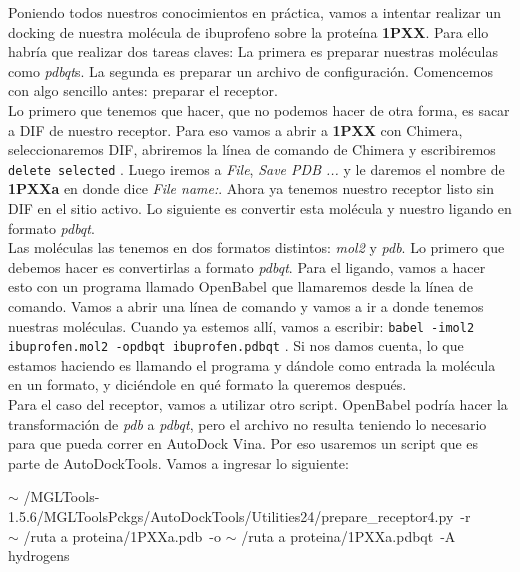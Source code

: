 \documentclass[10pt,letterpaper]{article}
\newcommand{\inlinecode}[1]{
\colorbox{light-gray}{\texttt{#1}}
}
\newenvironment{Code}
{
\begin{lrbox}{\selvestebox}%
\begin{minipage}{\dimexpr\columnwidth-2\fboxsep\relax}
\fontfamily{\ttdefault}\selectfont
}
{\end{minipage}\end{lrbox}%
\begin{center}
\colorbox{light-gray}{\usebox{\selvestebox}}
\end{center}
}
\begin{document}
Poniendo todos nuestros conocimientos en pr\'actica, vamos a intentar realizar un docking de nuestra mol\'ecula de ibuprofeno sobre la prote\'ina \textbf{1PXX}. Para ello habr\'ia que realizar dos tareas claves: La primera es preparar nuestras mol\'eculas como \textit{pdbqt}s. La segunda es preparar un archivo de configuraci\'on. Comencemos con algo sencillo antes: preparar el receptor.\\

Lo primero que tenemos que hacer, que no podemos hacer de otra forma, es sacar a DIF de nuestro receptor. Para eso vamos a abrir a \textbf{1PXX} con Chimera, seleccionaremos DIF, abriremos la l\'inea de comando de Chimera y escribiremos \inlinecode{delete selected}. Luego iremos a \emph{File}, \emph{Save PDB ...} y le daremos el nombre de \textbf{1PXXa} en donde dice \emph{File name:}. Ahora ya tenemos nuestro receptor listo sin DIF en el sitio activo. Lo siguiente es convertir esta mol\'ecula y nuestro ligando en formato \emph{pdbqt}.\\

Las mol\'eculas las tenemos en dos formatos distintos: \emph{mol2} y \emph{pdb}. Lo primero que debemos hacer es convertirlas a formato \emph{pdbqt}. Para el ligando, vamos a hacer esto con un programa llamado OpenBabel que llamaremos desde la l\'inea de comando. Vamos a abrir una l\'inea de comando y vamos a ir a donde tenemos nuestras mol\'eculas. Cuando ya estemos all\'i, vamos a escribir: \inlinecode{babel -imol2 ibuprofen.mol2 -opdbqt ibuprofen.pdbqt}. Si nos damos cuenta, lo que estamos haciendo es llamando el programa y d\'andole como entrada la mol\'ecula en un formato, y dici\'endole en qu\'e formato la queremos despu\'es.\\

Para el caso del receptor, vamos a utilizar otro script. OpenBabel podr\'ia hacer la transformaci\'on de \emph{pdb} a \emph{pdbqt}, pero el archivo no resulta teniendo lo necesario para que pueda correr en AutoDock Vina. Por eso usaremos un script que es parte de AutoDockTools. Vamos a ingresar lo siguiente:

\begin{flushleft}
\begin{Code}
$\sim$\hspace*{-2mm} /MGLTools-1.5.6/MGLToolsPckgs/AutoDockTools/Utilities24/prepare\_receptor4.py\ -r\\ \hspace*{4mm}$\sim$\hspace*{-2mm} /ruta a proteina/1PXXa.pdb\ -o $\sim$\hspace*{-2mm} /ruta a proteina/1PXXa.pdbqt\ -A hydrogens
\end{Code}
\end{flushleft}
\end{document}
